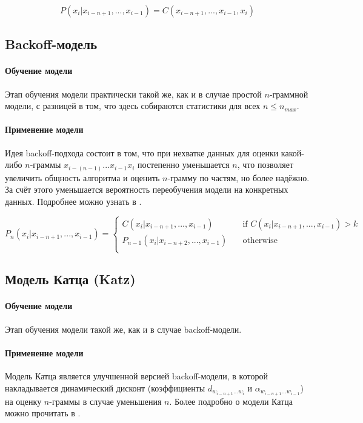 $$ P(x_i | x_{i - n + 1}, ..., x_{i - 1}) = C(x_{i - n + 1}, ..., x_{i - 1}, x_i) $$

\subsection{ Backoff-модель } 

\paragraph{ Обучение модели } Этап обучения модели практически такой же, как и в случае простой $n$-граммной модели, с разницей в том, что здесь собираются статистики для всех $n \leq n_{max}$.

\paragraph{ Применение модели } Идея backoff-подхода состоит в том, что при нехватке данных для оценки какой-либо $n$-граммы $x_{i - (n - 1)} ... x_{i - 1} x_i$ постепенно уменьшается $n$, что позволяет увеличить общность алгоритма и оценить $n$-грамму по частям, но более надёжно. За счёт этого уменьшается вероятность переобучения модели на конкретных данных. Подробнее можно узнать в \cite{manning}.

\[ P_n(x_i | x_{i - n + 1}, ..., x_{i - 1}) =
\begin{cases}
	C(x_i | x_{i - n + 1}, ..., x_{i - 1})       & \quad \text{if } C(x_i | x_{i - n + 1}, ..., x_{i - 1}) > k\\
	P_{n - 1}(x_i | x_{i - n + 2}, ..., x_{i - 1})  & \quad \text{otherwise }\\
\end{cases}
\]

\subsection{ Модель Катца (Katz) }

\paragraph{ Обучение модели } Этап обучения модели такой же, как и в случае backoff-модели.

\paragraph{ Применение модели } Модель Катца является улучшенной версией backoff-модели, в которой накладывается динамический дисконт (коэффициенты $d_{w_{i-n+1}...w_i}$ и $\alpha_{w_{i-n+1}...w_{i-1}}$) на оценку $n$-граммы в случае уменьшения $n$. Более подробно о модели Катца можно прочитать в \cite{katz:backoff}.

